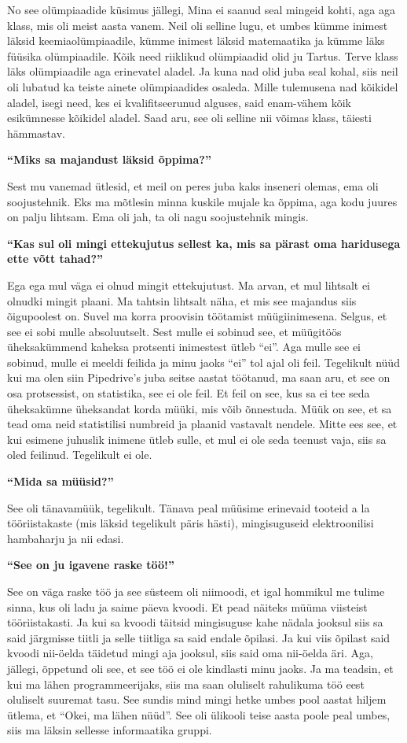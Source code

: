 No see olümpiaadide küsimus jällegi, Mina ei saanud seal mingeid kohti, aga aga
klass, mis oli meist aasta vanem. Neil oli selline lugu, et umbes kümme
inimest läksid keemiaolümpiaadile, kümme inimest läksid matemaatika ja kümme
läks füüsika olümpiaadile. Kõik need riiklikud olümpiaadid olid ju Tartus.
Terve klass läks olümpiaadile aga erinevatel aladel. Ja kuna nad olid juba seal
kohal, siis neil oli lubatud ka teiste ainete olümpiaadides osaleda. Mille
tulemusena nad kõikidel aladel, isegi need, kes ei kvalifitseerunud alguses,
said enam-vähem kõik esikümnesse kõikidel aladel. Saad aru, see oli selline nii
võimas klass, täiesti hämmastav.

\textbf{\enquote{Miks sa majandust läksid õppima?}}

Sest mu vanemad ütlesid, et meil on peres juba kaks inseneri olemas, ema oli
soojustehnik. Eks ma mõtlesin minna kuskile mujale ka õppima, aga kodu juures
on palju lihtsam. Ema oli jah, ta oli nagu soojustehnik mingis.

\textbf{\enquote{Kas sul oli mingi ettekujutus sellest ka, mis sa pärast oma haridusega ette võtt tahad?}}

Ega ega mul väga ei olnud mingit ettekujutust. Ma arvan, et mul lihtsalt ei
olnudki mingit plaani. Ma tahtsin lihtsalt näha, et mis see majandus siis
õigupoolest on. Suvel ma korra proovisin töötamist müügiinimesena. Selgus, et
see ei sobi mulle absoluutselt. Sest mulle ei sobinud see, et müügitöös
üheksakümmend kaheksa protsenti inimestest ütleb \enquote{ei}. Aga mulle see ei
sobinud, mulle ei meeldi feilida ja minu jaoks \enquote{ei} tol ajal oli feil.
Tegelikult nüüd kui ma olen siin Pipedrive's juba seitse
aastat töötanud, ma saan aru, et see on osa protsessist, on statistika, see ei
ole feil. Et feil on see, kus sa ei tee seda üheksakümne üheksandat korda
müüki, mis võib õnnestuda. Müük on see, et sa tead oma neid statistilisi
numbreid ja plaanid vastavalt nendele. Mitte ees see, et kui esimene juhuslik
inimene ütleb sulle, et mul ei ole seda teenust vaja, siis sa oled feilinud.
Tegelikult ei ole.

\textbf{\enquote{Mida sa müüsid?}}

See oli tänavamüük, tegelikult. Tänava peal müüsime erinevaid tooteid a la
tööriistakaste (mis läksid tegelikult päris hästi), mingisuguseid
elektroonilisi hambaharju ja nii edasi.

\textbf{\enquote{See on ju igavene raske töö!}}

See on väga raske töö ja see süsteem oli niimoodi, et igal hommikul me tulime
sinna, kus oli ladu ja saime päeva kvoodi. Et pead näiteks müüma viisteist
tööriistakasti. Ja kui sa kvoodi täitsid mingisuguse kahe nädala jooksul siis
sa said järgmisse tiitli ja selle tiitliga sa said endale õpilasi. Ja kui viis
õpilast said kvoodi nii-öelda täidetud mingi aja jooksul, siis said oma
nii-öelda äri. Aga, jällegi, õppetund oli see, et see töö ei ole kindlasti minu
jaoks. Ja ma teadsin, et kui ma lähen programmeerijaks, siis ma saan oluliselt
rahulikuma töö eest oluliselt suuremat tasu. See sundis mind mingi hetke umbes
pool aastat hiljem ütlema, et \enquote{Okei, ma lähen nüüd}. See oli ülikooli
teise aasta poole peal umbes, siis ma läksin sellesse informaatika gruppi.

